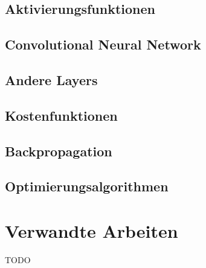 \subsection{Aktivierungsfunktionen}\label{subsection:ktivierungsfunktionen}
\subsection{Convolutional Neural Network}
\subsection{Andere Layers}
\subsection{Kostenfunktionen}
\subsection{Backpropagation}\label{subsection:backpropagation}
\subsection{Optimierungsalgorithmen}
\section{Verwandte Arbeiten}
TODO